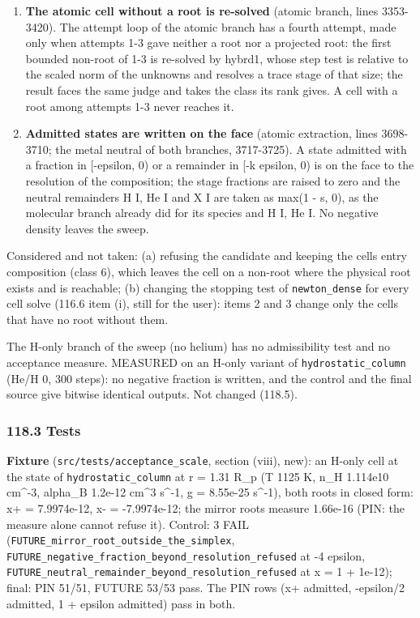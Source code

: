 \documentclass[english,a4paper]{my_memo}
\begin{document}
\begin{enumerate}
  2.1e-13 of the element, and \texttt{mol\_lyman\_werner} 87 against 85). The mirror
  root projects to x = 0, where the row\textquotesingle s imbalance is its whole production:
  no root.
\item
  \textbf{The atomic cell without a root is re-solved} (atomic branch, lines
  3353-3420). The attempt loop of the atomic branch has a fourth attempt,
  made only when attempts 1-3 gave neither a root nor a projected root: the
  first bounded non-root of 1-3 is re-solved by hybrd1, whose step test is
  relative to the scaled norm of the unknowns and resolves a trace stage of
  that size; the result faces the same judge and takes the class its rank
  gives. A cell with a root among attempts 1-3 never reaches it.
\item
  \textbf{Admitted states are written on the face} (atomic extraction, lines
  3698-3710; the metal neutral of both branches, 3717-3725). A state
  admitted with a fraction in {[}-epsilon, 0) or a remainder in
  {[}-k epsilon, 0) is on the face to the resolution of the composition; the
  stage fractions are raised to zero and the neutral remainders H I, He I
  and X I are taken as max(1 - s, 0), as the molecular branch already did
  for its species and H I, He I. No negative density leaves the sweep.
\end{enumerate}

Considered and not taken: (a) refusing the candidate and keeping the cell\textquotesingle s
entry composition (class 6), which leaves the cell on a non-root where the
physical root exists and is reachable; (b) changing the stopping test of
\texttt{newton\_dense} for every cell solve (116.6 item (i), still for the user):
items 2 and 3 change only the cells that have no root without them.

The H-only branch of the sweep (no helium) has no admissibility test and no
acceptance measure. MEASURED on an H-only variant of \texttt{hydrostatic\_column}
(He/H 0, 300 steps): no negative fraction is written, and the control and
the final source give bitwise identical outputs. Not changed (118.5).

\subsubsection{118.3 Tests}\label{1183-tests}

\textbf{Fixture} (\texttt{src/tests/acceptance\_scale}, section (viii), new): an H-only
cell at the state of \texttt{hydrostatic\_column} at r = 1.31 R\_p (T 1125 K, n\_H
1.114e10 cm\^{}-3, alpha\_B 1.2e-12 cm\^{}3 s\^{}-1, g = 8.55e-25 s\^{}-1), both roots in
closed form: x+ = 7.9974e-12, x- = -7.9974e-12; the mirror root\textquotesingle s measure
1.66e-16 (PIN: the measure alone cannot refuse it). Control: 3 FAIL
(\texttt{FUTURE\_mirror\_root\_outside\_the\_simplex},
\texttt{FUTURE\_negative\_fraction\_beyond\_resolution\_refused} at -4 epsilon,
\texttt{FUTURE\_neutral\_remainder\_beyond\_resolution\_refused} at x = 1 + 1e-12); final:
PIN 51/51, FUTURE 53/53 pass. The PIN rows (x+ admitted, -epsilon/2
admitted, 1 + epsilon admitted) pass in both.
\end{document}
